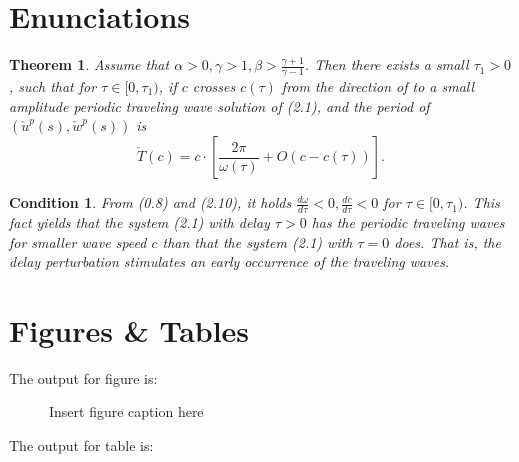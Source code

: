 \documentclass[]{rsos}%
\newtheorem{theorem}{\bf Theorem}[section]
\newtheorem{condition}{\bf Condition}[section]
\begin{document}

\maketitle

\section{Enunciations}

\begin{theorem}\label{T0.1}
Assume that $\alpha>0, \gamma>1, \beta>\frac{\gamma+1}{\gamma-1}$.
Then there exists a small $\tau_1>0$, such that for $\tau\in
[0,\tau_1)$, if $c$ crosses $c(\tau)$ from the direction of
to  a small amplitude periodic traveling wave solution of
(2.1), and the period of $(\check{u}^p(s),\check{w}^p(s))$ is
\[
\check{T}(c)=c\cdot \left[\frac{2\pi}{\omega(\tau)}+O(c-c(\tau))\right].
\]
\end{theorem}


\begin{condition}\label{C2.2}
From (0.8) and (2.10), it holds
$\frac{d\omega}{d\tau}<0,\frac{dc}{d\tau}<0$ for $\tau\in
[0,\tau_1)$. This fact yields that the system (2.1) with delay
$\tau>0$ has the periodic traveling waves for smaller wave speed $c$
than that the system (2.1) with $\tau=0$ does. That is, the
delay perturbation stimulates an early occurrence of the traveling waves.
\end{condition}


\section{Figures \& Tables}

The output for figure is:

\begin{figure}[!h]
\caption{Insert figure caption here}
\label{fig_sim}
\end{figure}

\vspace*{-10pt}

\noindent The output for table is:
\end{document}
